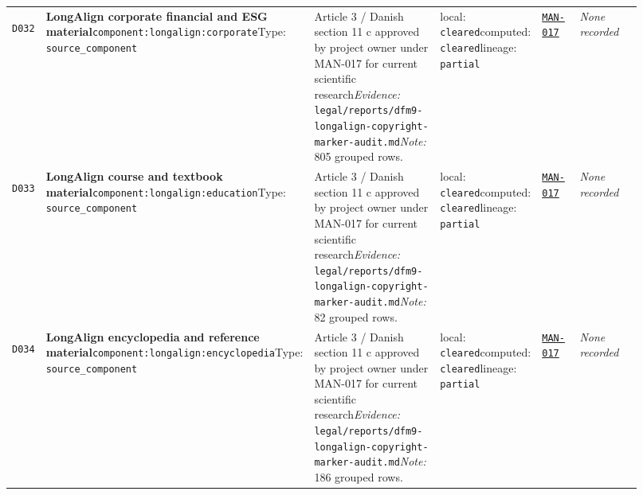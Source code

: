 \documentclass[9pt,a4paper]{article}
\newcommand{\depid}[1]{\hypertarget{dep:#1}{\texttt{#1}}}
\begin{document}
\begin{landscape}
\begin{longtable}{@{}L{0.035\linewidth}L{0.185\linewidth}L{0.27\linewidth}L{0.09\linewidth}L{0.10\linewidth}L{0.24\linewidth}@{}}
\depid{D032} & \textbf{LongAlign corporate financial and ESG material}\newline \nolinkurl{component:longalign:corporate}\newline Type: \texttt{source\_component} & Article 3 / Danish section 11 c approved by project owner under MAN-017 for current scientific research\newline \textit{Evidence:} \nolinkurl{legal/reports/dfm9-longalign-copyright-marker-audit.md}\newline \textit{Note:} 805 grouped rows. & local: \texttt{cleared}\newline computed: \texttt{cleared}\newline lineage: \texttt{partial} & \hyperlink{manual:MAN-017}{\texttt{MAN-017}} & \textit{None recorded} \\
\depid{D033} & \textbf{LongAlign course and textbook material}\newline \nolinkurl{component:longalign:education}\newline Type: \texttt{source\_component} & Article 3 / Danish section 11 c approved by project owner under MAN-017 for current scientific research\newline \textit{Evidence:} \nolinkurl{legal/reports/dfm9-longalign-copyright-marker-audit.md}\newline \textit{Note:} 82 grouped rows. & local: \texttt{cleared}\newline computed: \texttt{cleared}\newline lineage: \texttt{partial} & \hyperlink{manual:MAN-017}{\texttt{MAN-017}} & \textit{None recorded} \\
\depid{D034} & \textbf{LongAlign encyclopedia and reference material}\newline \nolinkurl{component:longalign:encyclopedia}\newline Type: \texttt{source\_component} & Article 3 / Danish section 11 c approved by project owner under MAN-017 for current scientific research\newline \textit{Evidence:} \nolinkurl{legal/reports/dfm9-longalign-copyright-marker-audit.md}\newline \textit{Note:} 186 grouped rows. & local: \texttt{cleared}\newline computed: \texttt{cleared}\newline lineage: \texttt{partial} & \hyperlink{manual:MAN-017}{\texttt{MAN-017}} & \textit{None recorded} \\

\end{longtable}
\end{landscape}
\end{document}
